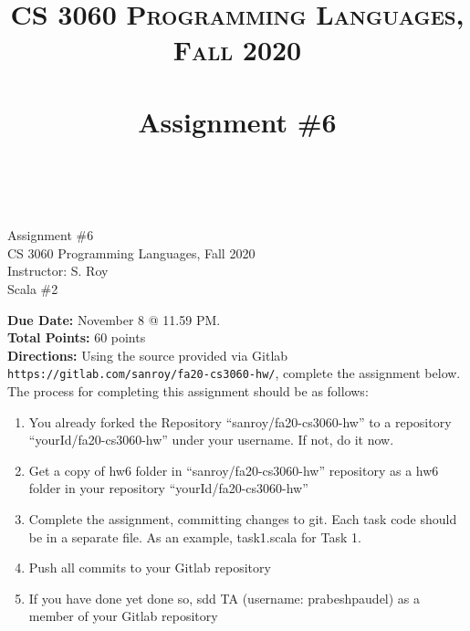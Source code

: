 \documentclass[paper=letter, fontsize=11pt]{scrartcl} %
\title{ 
    \normalfont \normalsize 
    \textsc{CS 3060 Programming Languages, Fall 2020} \\ [25pt] %
    \horrule{0.5pt} \\[0.4cm] %
    \huge Assignment \#6  \\ %
    \horrule{2pt} \\[0.5cm] %
}
\begin{document}
    \begin{center}
         Assignment \#6\\
        \small CS 3060 Programming Languages, Fall 2020 \\
        \small Instructor: S. Roy \\
        \huge Scala \#2
    \end{center}
    
    \textbf{Due Date:} November 8 @ 11.59 PM. \\
    \textbf{Total Points:} 60 points \\

    \textbf{Directions:} Using the source provided via Gitlab \@ \texttt{https://gitlab.com/sanroy/fa20-cs3060-hw/},
complete the assignment below. The process for completing this assignment should be as follows:

    \begin{enumerate}[noitemsep]
        \item You already forked the Repository ``sanroy/fa20-cs3060-hw'' to a repository ``yourId/fa20-cs3060-hw'' under your username. If not, do it now.
        \item Get a copy of hw6 folder in ``sanroy/fa20-cs3060-hw'' repository as a hw6 folder in your repository ``yourId/fa20-cs3060-hw''
        \item Complete the assignment, committing changes to git. Each task code should be in a separate file. As an example, task1.scala for Task 1.
        \item Push all commits to your Gitlab repository
        \item If you have done yet done so, sdd TA (username: prabeshpaudel) as a member of your Gitlab repository
    \end{enumerate}
\end{document}
